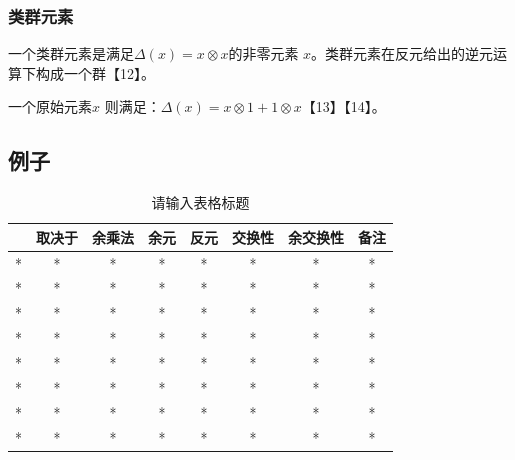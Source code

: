 \subsubsection{类群元素}
一个类群元素是满足$\Delta(x) = x \otimes x$的非零元素 $x$。类群元素在反元给出的逆元运算下构成一个群【12】。

一个原始元素$x$ 则满足：$\Delta(x) = x \otimes 1 + 1 \otimes x$【13】【14】。 
\subsection{例子}
\begin{table}[ht]
\centering
\caption{请输入表格标题}\label{tab_HPFds1}
\begin{tabular}{|c|c|c|c|c|c|c|c|}
\hline
 & 取决于 & 余乘法 & 余元 & 反元 & 交换性 & 余交换性 & 备注 \\
\hline
* & * & * & * & * & * & * & * \\
\hline
* & * & * & * & * & * & * & * \\
\hline
* & * & * & * & * & * & * & * \\
\hline
* & * & * & * & * & * & * & * \\
\hline
* & * & * & * & * & * & * & * \\
\hline
* & * & * & * & * & * & * & * \\
\hline
* & * & * & * & * & * & * & * \\
\hline
* & * & * & * & * & * & * & * \\
\hline
\end{tabular}
\end{table}

